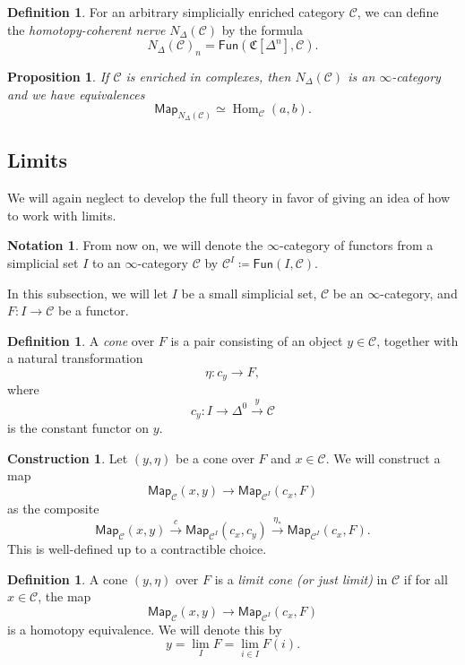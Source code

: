 \documentclass[10pt, oneside]{memoir}
\newtheorem{prop}[thm]{Proposition}
\theoremstyle{definition}
\newtheorem{defn}[thm]{Definition}
\newtheorem{con}[thm]{Construction}
\newtheorem{notn}[thm]{Notation}
\theoremstyle{remark}
\theoremstyle{plain}
\theoremstyle{definition}
\theoremstyle{remark}
\newcommand{\mc}[1]{\mathcal{#1}}
\newcommand{\mf}[1]{\mathfrak{#1}}
\newcommand{\ms}[1]{\mathsf{#1}}
\newcommand{\1}{\mathbf{1}}
\newcommand{\2}{\mathbf{2}}
\newcommand{\3}{\mathbf{3}}
\DeclareMathOperator{\Hom}{Hom}
\begin{document}
\begin{defn}
    For an arbitrary simplicially enriched category $\mc{C}$, we can define the \textit{homotopy-coherent nerve} $N_{\Delta}(\mc{C})$ by the formula
    \[ N_{\Delta}(\mc{C})_n = \ms{Fun}(\mf{C}[\Delta^n], \mc{C}). \]
\end{defn}

\begin{prop}
    If $\mc{C}$ is enriched in complexes, then $N_{\Delta}(\mc{C})$ is an $\infty$-category and we have equivalences
    \[ \ms{Map}_{N_{\Delta}(\mc{C})} \simeq \Hom_{\mc{C}}(a,b). \]
\end{prop}

\subsection{Limits}%
\label{sub:Limits}

We will again neglect to develop the full theory in favor of giving an idea of how to work with limits.

\begin{notn}
    From now on, we will denote the $\infty$-category of functors from a simplicial set $I$ to an $\infty$-category $\mc{C}$ by $\mc{C}^I \coloneqq \ms{Fun}(I, \mc{C})$.
\end{notn}

In this subsection, we will let $I$ be a small simplicial set, $\mc{C}$ be an $\infty$-category, and $F \colon I \to \mc{C}$ be a functor.

\begin{defn}
    A \textit{cone} over $F$ is a pair consisting of an object $y \in \mc{C}$, together with a natural transformation 
    \[ \eta \colon c_y \to F, \]
    where 
    \[ c_y \colon I \to \Delta^0 \xrightarrow{y} \mc{C} \]
    is the constant functor on $y$.
\end{defn}

\begin{con}
    Let $(y, \eta)$ be a cone over $F$ and $x \in \mc{C}$. We will construct a map
    \[ \ms{Map}_{\mc{C}}(x,y) \to \ms{Map}_{\mc{C}^I} (c_x, F) \]
    as the composite
    \[ \ms{Map}_{\mc{C}}(x,y) \xrightarrow{c} \ms{Map}_{\mc{C}^I} (c_x, c_y) \xrightarrow{\eta_*} \ms{Map}_{\mc{C}^I} (c_x, F). \]
    This is well-defined up to a contractible choice.
\end{con}

\begin{defn}
    A cone $(y, \eta)$ over $F$ is a \textit{limit cone (or just limit)} in $\mc{C}$ if for all $x \in \mc{C}$, the map
    \[ \ms{Map}_{\mc{C}}(x,y) \to \ms{Map}_{\mc{C}^I}(c_x, F) \]
    is a homotopy equivalence. We will denote this by
    \[ y = \lim_I F = \lim_{i \in I} F(i). \]
\end{defn}
\end{document}
